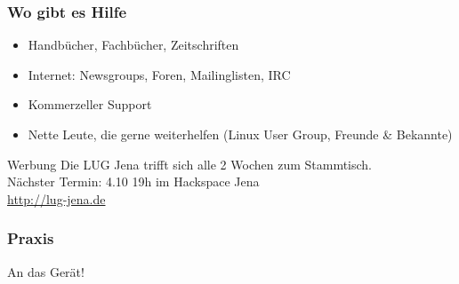 \documentclass[compress]{beamer}
\begin{document}
\begin{frame}
	\frametitle{Wo gibt es Hilfe}
	\begin{block}{}
		\begin{itemize}
			\item Handbücher, Fachbücher, Zeitschriften
			\item Internet: Newsgroups, Foren, Mailinglisten, IRC
			\item Kommerzeller Support
			\item Nette Leute, die gerne weiterhelfen (Linux User Group, 
				Freunde \& Bekannte)
		\end{itemize}
	\end{block}
	\pause{}
	\begin{block}{Werbung}
		Die LUG Jena trifft sich alle 2 Wochen zum Stammtisch.\\
		Nächster Termin: 4.10 19h im Hackspace Jena \\
		\url{http://lug-jena.de}
	\end{block}
\end{frame}

\begin{frame}
	\frametitle{Praxis}
	\center{}	\Huge{An das Gerät!}
\end{frame}
\end{document}
